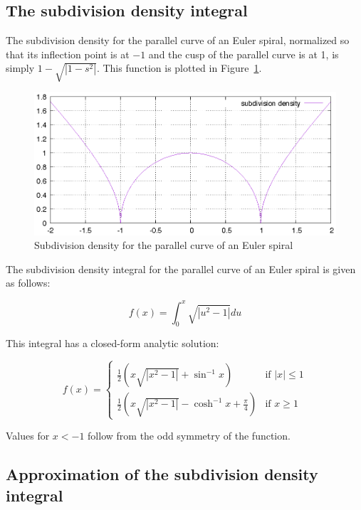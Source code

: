 \documentclass[sigconf, nonacm]{acmart}
\begin{document}
\subsection{The subdivision density integral} \label{subsection:subdiv-density-int}

The subdivision density for the parallel curve of an Euler spiral, normalized so that its inflection point is at $-1$ and the cusp of the parallel curve is at 1, is simply $1 - \sqrt{|1-s^2|}$. This function is plotted in Figure~\ref{fig:subdiv_density}.

\begin{figure}
    \includegraphics[scale=0.6]{subdiv_density}
    \caption{Subdivision density for the parallel curve of an Euler spiral}
    \label{fig:subdiv_density}
\end{figure}

The subdivision density integral for the parallel curve of an Euler spiral is given as follows:

\[
    f(x) = \int_0^x\sqrt{|u^2 - 1|} du
\]

This integral has a closed-form analytic solution:

\[
    f(x) = \left\{
        \begin{array}{rl}
            \frac{1}{2}(x\sqrt{|x^2-1|} + \sin^{-1}x) & \text{if } |x| \leq 1 \\
            \frac{1}{2}(x\sqrt{|x^2-1|} - \cosh^{-1}x + \frac{\pi}{4}) & \text{if } x \geq 1
        \end{array}
    \right.
\]

Values for $x<-1$ follow from the odd symmetry of the function. 


\subsection{Approximation of the subdivision density integral}
\end{document}
